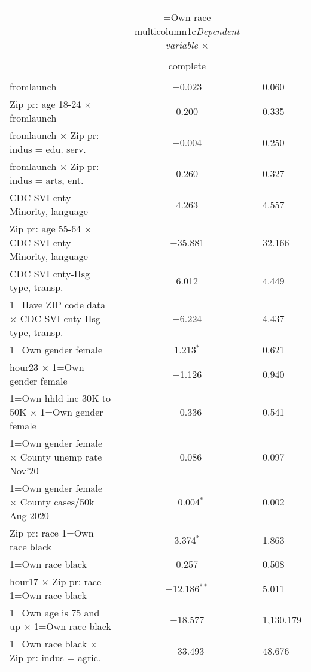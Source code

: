 
\begin{table}[!htbp] \centering 
  \caption{} 
  \label{} 
\begin{tabular}{@{\extracolsep{5pt}}lc} 
\\[-1.8ex]\hline 
\hline \\[-1.8ex] 
 & \1=Own race multicolumn{1}{c}{\textit{Dependent variable $\times$ }} \\ 
\\[-1.8ex] & complete \\ 
\hline \\[-1.8ex] 
 fromlaunch & $-$0.023 & 0.060 \\ 
  Zip pr: age 18-24 $\times$ fromlaunch & 0.200 & 0.335 \\ 
  fromlaunch $\times$ Zip pr: indus = edu. serv. & $-$0.004 & 0.250 \\ 
  fromlaunch $\times$ Zip pr: indus = arts, ent. & 0.260 & 0.327 \\ 
  CDC SVI cnty-Minority, language & 4.263 & 4.557 \\ 
  Zip pr: age 55-64 $\times$ CDC SVI cnty-Minority, language & $-$35.881 & 32.166 \\ 
  CDC SVI cnty-Hsg type, transp. & 6.012 & 4.449 \\ 
  1=Have ZIP code data $\times$ CDC SVI cnty-Hsg type, transp. & $-$6.224 & 4.437 \\ 
  1=Own gender female & 1.213$^{*}$ & 0.621 \\ 
  hour23 $\times$ 1=Own gender female & $-$1.126 & 0.940 \\ 
  1=Own hhld inc 30K to 50K $\times$ 1=Own gender female & $-$0.336 & 0.541 \\ 
  1=Own gender female $\times$ County unemp rate Nov'20 & $-$0.086 & 0.097 \\ 
  1=Own gender female $\times$ County cases/50k Aug 2020 & $-$0.004$^{*}$ & 0.002 \\ 
  Zip pr: race 1=Own race black & 3.374$^{*}$ & 1.863 \\ 
  1=Own race black & 0.257 & 0.508 \\ 
  hour17 $\times$ Zip pr: race 1=Own race black & $-$12.186$^{**}$ & 5.011 \\ 
  1=Own age is 75 and up  $\times$ 1=Own race black & $-$18.577 & 1,130.179 \\ 
  1=Own race black $\times$ Zip pr: indus = agric. & $-$33.493 & 48.676 \\ 

\end{tabular}
\end{table}

